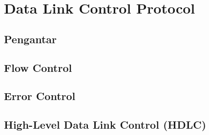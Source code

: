 \chapter{Data Link Control Protocol}

\section{Pengantar}

\section{Flow Control}

\section{Error Control}

\section{High-Level Data Link Control (HDLC)}